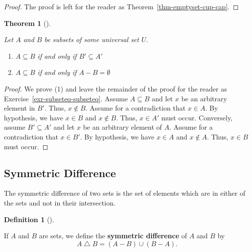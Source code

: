 \documentclass[
  letterpaper,
  10pt,
  reqno,
  twopage,
  openany]{book}
\providecommand{\tightlist}{%
  \setlength{\itemsep}{0pt}\setlength{\parskip}{0pt}}\usepackage{longtable,booktabs,array}
\theoremstyle{plain}
\theoremstyle{definition}
\theoremstyle{definition}
\newtheorem{definition}{Definition}[chapter]
\theoremstyle{definition}
\theoremstyle{plain}
\theoremstyle{plain}
\newtheorem{theorem}{Theorem}[chapter]
\theoremstyle{remark}
\begin{document}
\begin{proof}

The proof is left for the reader as Theorem~\ref{thm-emptyset-cup-cap}.

\end{proof}

\leavevmode{}%
\begin{theorem}[]\label{thm-subseteq-subseteq}

Let \(A\) and \(B\) be subsets of some universal set \(U.\)

\begin{enumerate}
\def\labelenumi{\arabic{enumi}.}
\tightlist
\item
  \(A \subseteq B\) if and only if \(B'\subseteq A'\)
\item
  \(A\subseteq B\) if and only if \(A-B=\emptyset\)
\end{enumerate}

\end{theorem}

\begin{proof}

We prove (1) and leave the remainder of the proof for the reader as
Exercise~\ref{exr-subseteq-subseteq}. Assume \(A\subseteq B\) and let
\(x\) be an arbitrary element in \(B'.\) Thus, \(x\notin B.\) Assume for
a contradiction that \(x\in A.\) By hypothesis, we have \(x\in B\) and
\(x\notin B.\) Thus, \(x\in A'\) must occur. Conversely, assume
\(B'\subseteq A'\) and let \(x\) be an arbitrary element of \(A.\)
Assume for a contradiction that \(x\in B'.\) By hypothesis, we have
\(x\in A\) and \(x\notin A.\) Thus, \(x\in B\) must occur.

\end{proof}

\hypertarget{symmetric-difference}{%
\subsection{Symmetric Difference}\label{symmetric-difference}}

The symmetric difference of two sets is the set of elements which are in
either of the sets and not in their intersection.

\leavevmode{}%
\begin{definition}[]\label{def-symmetric-difference}

If \(A\) and \(B\) are sets, we define the 
\textbf{symmetric difference} of \(A\) and \(B\) by \[
A\bigtriangleup B=(A-B)\cup (B-A).
\]

\end{definition}
\end{document}
